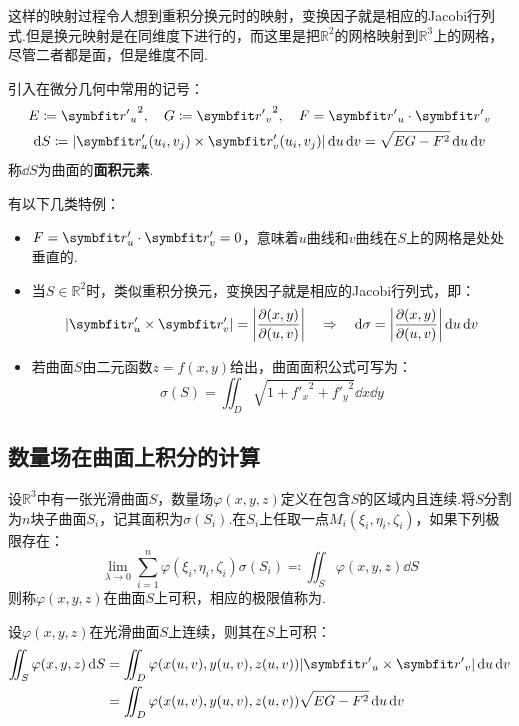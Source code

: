 \begin{mistake}
    这样的映射过程令人想到重积分换元时的映射，变换因子就是相应的Jacobi行列式.但是换元映射是在同维度下进行的，而这里是把$\mathbb{R}^2$的网格映射到$\mathbb{R}^3$上的网格，尽管二者都是面，但是维度不同.
\end{mistake}

引入在微分几何中常用的记号：
\begin{gather*}
    E \coloneq {\vb{r'}_u}^2,\quad G \coloneq {\vb{r'}_v}^2,\quad F = \vb{r'}_u \cdot \vb{r'}_v \\
    \dd{S} \coloneq |\vb{r}'_u(u_i,v_j) \times \vb{r}'_v(u_i,v_j)|\dd{u}\dd{v} = \sqrt{EG-F^2}\dd{u}\dd{v}
\end{gather*}
称$\dd{S}$为曲面的\textbf{面积元素}.

有以下几类特例：
\begin{itemize}
    \item $F = \vb{r}'_u \cdot \vb{r}'_v = 0$，意味着$u$曲线和$v$曲线在$S$上的网格是处处垂直的.
    \item 当$S \in \mathbb{R}^2$时，类似重积分换元，变换因子就是相应的Jacobi行列式，即：
    \[|\vb{r}'_u\times\vb{r}'_v| = \left|\pdv{(x,y)}{(u,v)}\right| \quad\Rightarrow\quad \dd{\sigma} = \left|\pdv{(x,y)}{(u,v)}\right|\dd{u}\dd{v}\]
    \item 若曲面$S$由二元函数$z = f(x,y)$给出，曲面面积公式可写为：
    \[\sigma(S) = \iint_D\sqrt{1+{f'_x}^2 + {f'_y}^2}\dd{x}\dd{y}\]
\end{itemize}


\subsection{数量场在曲面上积分的计算}
\begin{definition}
    设$\mathbb{R}^3$中有一张光滑曲面$S$，数量场$\varphi(x,y,z)$定义在包含$S$的区域内且连续.将$S$分割为$n$块子曲面$S_i$，记其面积为$\sigma(S_i)$.在$S_i$上任取一点$M_i(\xi_i,\eta_i,\zeta_i)$，如果下列极限存在：
    \[\lim_{\lambda\to0}\sum_{i=1}^{n}\varphi(\xi_i,\eta_i,\zeta_i)\sigma(S_i) \eqcolon \iint_S\varphi(x,y,z)\dd{S}\]
    则称$\varphi(x,y,z)$在曲面$S$上可积，相应的极限值称为.
\end{definition}

\begin{theorem}
    设$\varphi(x,y,z)$在光滑曲面$S$上连续，则其在$S$上可积：
    \begin{align*}
        \iint_S \varphi(x,y,z)\dd{S} &= \iint_D \varphi(x(u,v),y(u,v),z(u,v))|\vb{r'}_u\times\vb{r'}_v|\dd{u}\dd{v} \\
        &= \iint_D \varphi(x(u,v),y(u,v),z(u,v))\sqrt{EG-F^2}\dd{u}\dd{v}
    \end{align*}
\end{theorem}

